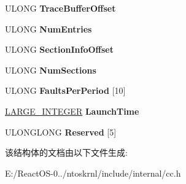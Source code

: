 \begin{DoxyCompactItemize}
\item 
\mbox{\label{struct___p_f___t_r_a_c_e___h_e_a_d_e_r_ab993ade1b4318c5e7a90ed6acb90ba98}} 
U\+L\+O\+NG {\bfseries Trace\+Buffer\+Offset}
\item 
\mbox{\label{struct___p_f___t_r_a_c_e___h_e_a_d_e_r_a27d4634e2760e4d4e1a60bcb4975e34d}} 
U\+L\+O\+NG {\bfseries Num\+Entries}
\item 
\mbox{\label{struct___p_f___t_r_a_c_e___h_e_a_d_e_r_ad77593a6ffc8073a0dd513d4fbaea8e9}} 
U\+L\+O\+NG {\bfseries Section\+Info\+Offset}
\item 
\mbox{\label{struct___p_f___t_r_a_c_e___h_e_a_d_e_r_a8a60e6aea160e3635b396dfddbcbdc3a}} 
U\+L\+O\+NG {\bfseries Num\+Sections}
\item 
\mbox{\label{struct___p_f___t_r_a_c_e___h_e_a_d_e_r_a246ca4672d32d089a0a9c811498d96ee}} 
U\+L\+O\+NG {\bfseries Faults\+Per\+Period} \mbox{[}10\mbox{]}
\item 
\mbox{\label{struct___p_f___t_r_a_c_e___h_e_a_d_e_r_a0f51c0b730b392e0aab7f207f20b3646}} 
\hyperlink{union___l_a_r_g_e___i_n_t_e_g_e_r}{L\+A\+R\+G\+E\+\_\+\+I\+N\+T\+E\+G\+ER} {\bfseries Launch\+Time}
\item 
\mbox{\label{struct___p_f___t_r_a_c_e___h_e_a_d_e_r_ae08ab8f26bafd1abda40e5e115c7f150}} 
U\+L\+O\+N\+G\+L\+O\+NG {\bfseries Reserved} \mbox{[}5\mbox{]}
\end{DoxyCompactItemize}


该结构体的文档由以下文件生成\+:\begin{DoxyCompactItemize}
\item 
E\+:/\+React\+O\+S-\/0../ntoskrnl/include/internal/cc.\+h\end{DoxyCompactItemize}
